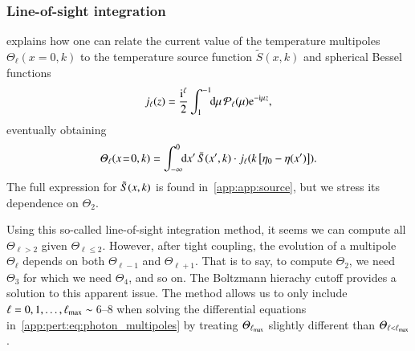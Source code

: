 \subsubsection{Line-of-sight integration}
    \citet{Callin2006} explains how one can relate the current value of the temperature multipoles $\Theta_\ell(x\!=\!0,k)$ to the temperature source function $\tilde{S}(x, k)$ and spherical Bessel functions  
    \begin{equation}
        j_\ell(z) = \frac{\im^{\ell}}{2} \int_{1}^{-1}\dx{\mu}  \mathcal{P}_\ell(\mu) \eu[-\im \mu z],
    \end{equation}
    eventually obtaining
    \begin{equation}\label{mil3:theo:eq:temp_multipole_and_source_func}
        \varTheta_\ell (x\!=\!0, k) = \int_{-\infty}^{0}\!\!\mathop{}\!\mathrm{d} {x'}\, \tilde{S}(x',k) \cdot j_\ell(k \left[\eta_0 - \eta(x')\right]).
    \end{equation}
    The full expression for $\tilde{S}(x, k)$ is found in~\cref{app:app:source}, but we stress its dependence on $\Theta_2$.

    Using this so-called line-of-sight integration method, it seems we can compute all $\Theta_{\ell>2}$ given $\Theta_{\ell\leq 2}$. However, after tight coupling, the evolution of a multipole $\Theta_\ell$ depends on both $\Theta_{\ell-1}$ and $\Theta_{\ell+1}$. That is to say, to compute $\Theta_2$, we need $\Theta_3$ for which we need $\Theta_4$, and so on. The Boltzmann hierachy cutoff provides a solution to this apparent issue. The method allows us to only include $\ell=0, 1, \dots, \ell_\mathrm{max}\sim$\,6--8 when solving the differential equations in~\cref{app:pert:eq:photon_multipoles} by treating $\varTheta_{\ell_\mathrm{max}}$ slightly different than $\varTheta_{\ell<\ell_\mathrm{max}}$. 
    




